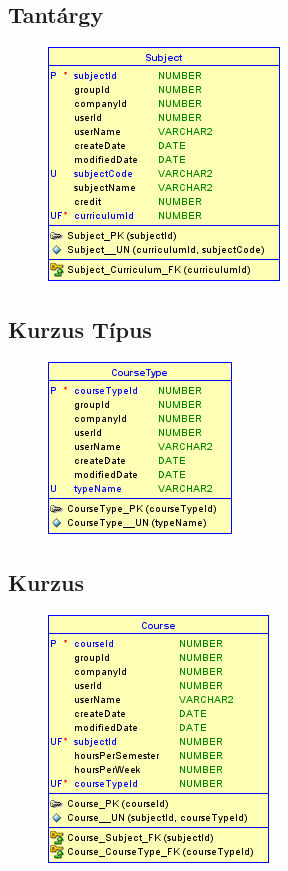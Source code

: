 \documentclass[hidelinks, 12pt, a4paper]{report}
\begin{document}
\subsection{Tantárgy}

\begin{figure}[H]
    \centering
	\includegraphics{subject.png}
\end{figure}

\subsection{Kurzus Típus}

\begin{figure}[H]
    \centering
	\includegraphics{course_type.png}
\end{figure}

\subsection{Kurzus}

\begin{figure}[H]
    \centering
	\includegraphics{course.png}
\end{figure}
\end{document}
